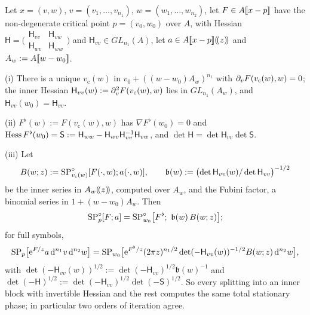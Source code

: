 \begin{lem}
\label{lem:fsp-fubini}
Let $x=(v,w)$, $v=(v_1,\dots,v_{n_1})$, $w=(w_1,\dots,w_{n_2})$, let $F\in A[\![ x-p ]\!]$ have the non-degenerate critical point $p=(v_0,w_0)$ over $A$, with Hessian $\mathsf H=\bigl(\begin{smallmatrix}\mathsf H_{vv}&\mathsf H_{vw}\\ \mathsf H_{wv}&\mathsf H_{ww}\end{smallmatrix}\bigr)$ and $\mathsf H_{vv}\in GL_{n_1}(A)$, let $a\in A[\![ x-p ]\!](\!(z)\!)$ and $A_w:=A[\![ w-w_0 ]\!]$.

(i) There is a unique $v_{\mathrm c}(w)$ in $v_0+((w-w_0)A_w)^{n_1}$ with $\partial_vF(v_{\mathrm c}(w),w)=0$; the inner Hessian $\mathsf H_{vv}(w):=\partial_v^2F(v_{\mathrm c}(w),w)$ lies in $GL_{n_1}(A_w)$, and $\mathsf H_{vv}(w_0)=\mathsf H_{vv}$.

(ii) $F^\flat(w):=F(v_{\mathrm c}(w),w)$ has $\nabla F^\flat(w_0)=0$ and $\operatorname{Hess} F^\flat(w_0)=\mathsf S:=\mathsf H_{ww}-\mathsf H_{wv}\mathsf H_{vv}^{-1}\mathsf H_{vw}$, and $\det\mathsf H=\det\mathsf H_{vv}\det\mathsf S$.

(iii) Let
\[
B(w;z):=\mathrm{SP}^{\circ}_{v_{\mathrm c}(w)}[F(\cdot,w);a(\cdot,w)],\qquad\mathfrak b(w):=\bigl(\det\mathsf H_{vv}(w)/\det\mathsf H_{vv}\bigr)^{-1/2}
\]
be the inner series in $A_w(\!(z)\!)$, computed over $A_w$, and the Fubini factor, a binomial series in $1+(w-w_0)A_w$. Then
\[
\SPn_p[F;a]=\SPn_{w_0}\bigl[F^\flat;\ \mathfrak b(w)\,B(w;z)\bigr];
\]
for full symbols,
\[
\mathrm{SP}_p\bigl[\mathrm{e}^{F/z}a\,\mathrm{d}^{n_1}v\,\mathrm{d}^{n_2}w\bigr]=\mathrm{SP}_{w_0}\bigl[\mathrm{e}^{F^\flat/z}(2\pi z)^{n_1/2}\det(-\mathsf H_{vv}(w))^{-1/2}B(w;z)\,\mathrm{d}^{n_2}w\bigr],
\]
with $\det(-\mathsf H_{vv}(w))^{1/2}:=\det(-\mathsf H_{vv})^{1/2}\mathfrak b(w)^{-1}$ and $\det(-\mathsf H)^{1/2}:=\det(-\mathsf H_{vv})^{1/2}\det(-\mathsf S)^{1/2}$. So every splitting into an inner block with invertible Hessian and the rest computes the same total stationary phase; in particular two orders of iteration agree.
\end{lem}

